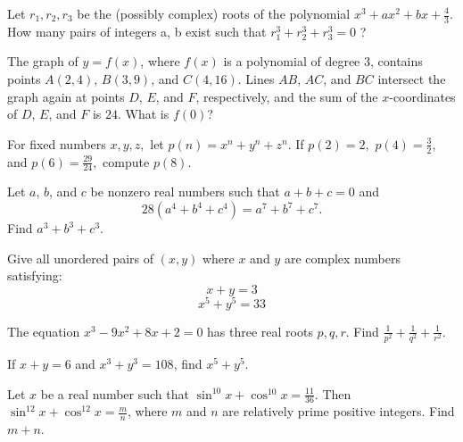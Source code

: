 \documentclass[mast]{lucky}
\begin{document}
\begin{prob}[BMT 2019]{4}

Let $r_1, r_2, r_3$ be the (possibly complex) roots of the polynomial $x^3 + ax^2 + bx + \frac{4}{3}$. How many
pairs of integers a, b exist such that $r_{1}^3 + r_{2}^3 + r_{3}^3 = 0$ ?
\end{prob}

\begin{req}[AMC 12B 2017/23]{4}
The graph of $y=f(x)$, where $f(x)$ is a polynomial of degree $3$, contains points $A(2,4)$, $B(3,9)$, and $C(4,16)$. Lines $AB$, $AC$, and $BC$ intersect the graph again at points $D$, $E$, and $F$, respectively, and the sum of the $x$-coordinates of $D$, $E$, and $F$ is $24$. What is $f(0)$?
\end{req}

\begin{prob}[FARML 2007/T9]{4}
For fixed numbers $x,y,z,$ let $p(n)=x^n+y^n+z^n.$ If $p(2)=2,$ $p(4)=\frac{3}{2},$ and $p(6)=\frac{29}{24},$ compute $p(8).$
\end{prob}

\begin{prob}{4}
Let $a$, $b$, and $c$ be nonzero real numbers such that $a+b+c=0$ and \[28(a^4+b^4+c^4) = a^7+b^7+c^7.\] Find $a^3+b^3+c^3$.
\end{prob}

\begin{prob}[]{4}
Give all unordered pairs of $(x,y)$ where $x$ and $y$ are complex numbers satisfying:
$$x+y=3$$
$$x^5+y^5=33$$
\end{prob}

\begin{req}[HMMT 2008]{4}
The equation $x^3-9x^2+8x+2=0$ has three real roots $p,q,r.$ Find $\frac{1}{p^2}+\frac{1}{q^2}+\frac{1}{r^2}.$
\end{req}



\begin{prob}{4}
If $x + y = 6$ and $x^3 + y^3 = 108$, find $x^5 + y^5$.
\end{prob}

\begin{prob}[2019 AIME I]{4}
Let $x$ be a real number such that $\sin^{10} x + \cos^{10}x=\frac{11}{36}$. Then $\sin^{12}x+\cos^{12}x=\frac{m}{n}$, where $m$ and $n$ are relatively prime positive integers. Find $m+n$.
\end{prob}
\end{document}
